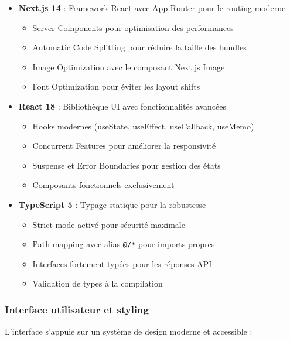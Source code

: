 \documentclass[12pt,a4paper]{report}
\begin{document}
\begin{itemize}
\item \textbf{Next.js 14} : Framework React avec App Router pour le routing moderne
  \begin{itemize}
  \item Server Components pour optimisation des performances
  \item Automatic Code Splitting pour réduire la taille des bundles
  \item Image Optimization avec le composant Next.js Image
  \item Font Optimization pour éviter les layout shifts
  \end{itemize}

\item \textbf{React 18} : Bibliothèque UI avec fonctionnalités avancées
  \begin{itemize}
  \item Hooks modernes (useState, useEffect, useCallback, useMemo)
  \item Concurrent Features pour améliorer la responsivité
  \item Suspense et Error Boundaries pour gestion des états
  \item Composants fonctionnels exclusivement
  \end{itemize}

\item \textbf{TypeScript 5} : Typage statique pour la robustesse
  \begin{itemize}
  \item Strict mode activé pour sécurité maximale
  \item Path mapping avec alias \texttt{@/*} pour imports propres
  \item Interfaces fortement typées pour les réponses API
  \item Validation de types à la compilation
  \end{itemize}
\end{itemize}

\subsubsection{Interface utilisateur et styling}
L'interface s'appuie sur un système de design moderne et accessible :
\end{document}
